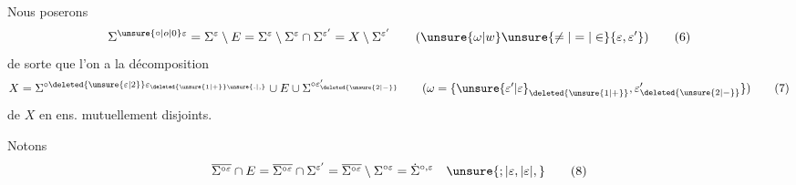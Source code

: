 Nous poserons
\[
\Sigma^{\unsure{\circ|o|0}\varepsilon}=\Sigma^\varepsilon\setminus E=\Sigma^\varepsilon\setminus\Sigma^\varepsilon\cap\Sigma^{\varepsilon'}=X\setminus\Sigma^{\varepsilon'}\qquad(\unsure{\omega|w}\unsure{\ne|=|\in}\{\varepsilon,\varepsilon'\})\tag*{(6)}
\]
de sorte que l'on a la décomposition
\[
X=\Sigma^{\circ\deleted{\unsure{\varepsilon|2}}\varepsilon_{\deleted{\unsure{1|+}}\unsure{.|,}}}\cup E\cup\Sigma^{\circ\varepsilon'_{\deleted{\unsure{2|-}}}}\qquad(\omega=\{\unsure{\varepsilon'|\varepsilon}_{\deleted{\unsure{1|+}}},\varepsilon'_{\deleted{\unsure{2|-}}}\})\tag*{(7)}
\]
de $X$ en  ens. mutuellement disjoints.

Notons
\[
\overline{\Sigma^{\circ\varepsilon}}\cap E=\overline{\Sigma^{\circ\varepsilon}}\cap\Sigma^{\varepsilon'}=\overline{\Sigma^{\circ\varepsilon}}\setminus\Sigma^{\circ\varepsilon}=\dot{\Sigma}^{\circ,\varepsilon}\quad\unsure{;|\varepsilon,|\varepsilon|,}\tag*{(8)}
\]

\par
{}

